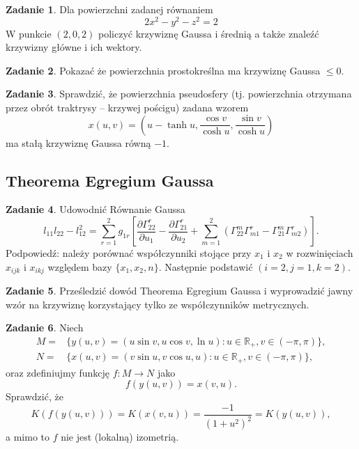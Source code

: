 \documentclass[a4paper,11pt]{article}
\theoremstyle{definition}\newtheorem{exercise}{Zadanie}
\theoremstyle{definition}\newtheorem{remark}{Uwaga}
\begin{document}
\begin{exercise}
Dla powierzchni zadanej równaniem
\[2 x^2 - y^2 - z^2 = 2\]
W punkcie $(2,0,2)$ policzyć krzywiznę Gaussa i średnią a także znaleźć 
krzywizny główne i ich wektory.
\end{exercise}


\begin{exercise}
 Pokazać że powierzchnia prostokreślna ma krzywiznę Gaussa $\leqslant 0$.
\end{exercise}


\begin{exercise}
 Sprawdzić, że powierzchnia pseudosfery (tj. powierzchnia otrzymana przez 
obr\'ot traktrysy -- krzywej pościgu) zadana wzorem
\[x(u,v)=\left(u-\tanh u, \frac{\cos v}{\cosh u},\frac{\sin v}{\cosh u}\right)\]
ma stałą krzywiznę Gaussa r\'owną $-1$.
\end{exercise}


\subsection{Theorema Egregium Gaussa}

\begin{exercise}
 Udowodnić R\'ownanie Gaussa
 \begin{equation*}
l_{11}l_{22}-l_{12}^2=
\sum_{r=1}^{2}g_{1r}
\left[
\frac{\partial \Gamma^r_{22}} {\partial u_{1}}- \frac{\partial\Gamma 
^r_{21}}{\partial u_{2}}+
\sum_{m=1}^2 
\left(\Gamma^m_{22}\Gamma^r_{m1}-\Gamma^m_{21}\Gamma^r_{m2}\right)\right].
\end{equation*}
\footnotesize{Podpowiedź: należy porównać współczynniki stojące przy $x_1$ i 
$x_2$ w rozwinięciach $x_{ijk} $ i $x_{ikj} $ względem bazy 
$\{x_1,x_2,n\}$. Następnie podstawić $(i=2,j=1,k=2)$.}

\end{exercise}

\begin{exercise}
 Prześledzić dow\'od Theorema Egregium Gaussa i wyprowadzić jawny wz\'or na 
krzywiznę korzystający tylko ze wsp\'ołczynnik\'ow metrycznych.
\end{exercise}

\begin{exercise}
Niech 
\begin{align*}
M=&\{y(u,v)=(u \sin v, u\cos v,\ln u)\colon u\in \mathbb{R}_+, v\in 
(-\pi,\pi)\},\\
N=&\{x(u,v)=(v \sin u, v\cos u, u)\colon u\in \mathbb{R}_+, v\in (-\pi,\pi)\},
\end{align*}
oraz zdefiniujmy funkcję $f\colon M\to N$ jako \[f(y(u,v))= x(v,u).\]
Sprawdzić, że 
\[K\left( f(y(u,v))\right)=K(x(v,u))=\frac{-1}{(1+u^2)^2}=K(y(u,v)),\]
a mimo to $f$ nie jest (lokalną) izometrią.
\end{exercise}
\end{document}
